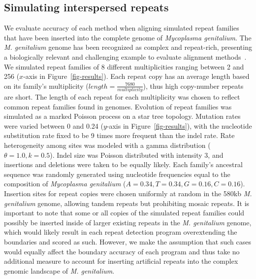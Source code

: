 \documentclass[9.5pt,journal,final,finalsubmission,twocolumn]{IEEEtran}
\begin{document}
\subsection*{Simulating interspersed repeats}
We evaluate accuracy of each method when aligning simulated repeat
families that have been inserted into the complete genome of
\emph{Mycoplasma genitalium}. The \emph{M. genitalium} genome has been recognized
as complex and repeat-rich, presenting a biologically
relevant and challenging example to evaluate alignment
methods~\cite{ref-mycoplasma}. We simulated repeat families of 8
different multiplicities ranging between 2 and 256 ($x$-axis in
Figure~\ref{fig-results}).  Each repeat copy has an average length
based on its family's multiplicity
($length=\frac{7680}{multiplicity}$), thus high copy-number repeats
are short.  The length of each repeat for each multiplicity was chosen
to reflect common repeat families found in genomes. Evolution of repeat families was simulated as a marked
Poisson process on a star tree
topology.  Mutation rates were varied between 0 and 0.24 ($y$-axis
in Figure~\ref{fig-results}), with the nucleotide substitution rate
fixed to be 9 times more frequent than the indel rate.  Rate heterogeneity among sites was modeled with a gamma
distribution ($\theta = 1.0, k = 0.5$).  Indel size was
Poisson distributed with intensity 3, and insertions and deletions
were taken to be equally likely.  Each family's ancestral
sequence was randomly generated using nucleotide frequencies equal to
the composition of \emph{Mycoplasma genitalium}
($A=0.34,T=0.34,G=0.16,C=0.16$). Insertion sites for repeat copies
were chosen uniformly at random in the 580kb \textit{M. genitalium} genome,
allowing tandem repeats but prohibiting mosaic repeats. It is important to note that some or all copies of the simulated repeat families
could possibly be inserted inside of larger existing repeats in the  \textit{M. genitalium} genome, which would
likely result in each repeat detection program overextending the boundaries and scored as such. However, we make the assumption
that such cases would equally affect the boundary accuracy of each program and thus take no additional measure to account for inserting
artificial repeats into the complex genomic landscape of \textit{M. genitalium}.
\end{document}
